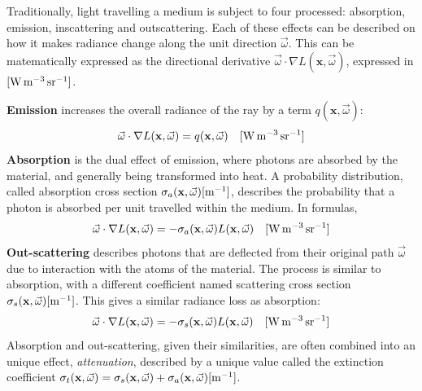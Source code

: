 Traditionally, light travelling a medium is subject to four processed: absorption, emission, inscattering and outscattering. Each of these effects can be described on how it makes radiance change along the unit direction $\vec{\omega}$. This can be matematically expressed as the directional derivative $\vec{\omega} \cdot \nabla L(\mathbf{x}, \vec{\omega})$, expressed in $\siunitnospace{\watt \per \cubic \metre \per \steradian}$. 

\textbf{Emission} increases the overall radiance of the ray by a term $q(\mathbf{x}, \vec{\omega})$:
\begin{equation*}
\vec{\omega} \cdot \nabla L(\mathbf{x}, \vec{\omega}) = q(\mathbf{x}, \vec{\omega}) \siunit{\watt \per \cubic \metre \per \steradian}
\end{equation*} 
\textbf{Absorption} is the dual effect of emission, where photons are absorbed by the material, and generally being transformed into heat. A probability distribution, called absorption cross section $\sigma_a(\mathbf{x}, \vec{\omega})  [\SI{}{\per \metre}] $, describes the probability that a photon is absorbed per unit travelled within the medium. In formulas,
\begin{equation*}
\vec{\omega} \cdot \nabla L(\mathbf{x}, \vec{\omega}) = - \sigma_a(\mathbf{x}, \vec{\omega}) L(\mathbf{x}, \vec{\omega})  \siunit{\watt \per \cubic \metre \per \steradian}
 \end{equation*}
\textbf{Out-scattering} describes photons that are deflected from their original path $\vec{\omega}$  due to interaction with the atoms of the material. The process is similar to absorption, with a different coefficient named scattering cross section $\sigma_s(\mathbf{x}, \vec{\omega}) [\SI{}{\per \metre}]$. This gives a similar radiance loss as absorption:
\begin{equation*}
\vec{\omega} \cdot \nabla L(\mathbf{x}, \vec{\omega}) = - \sigma_s(\mathbf{x}, \vec{\omega}) L(\mathbf{x}, \vec{\omega})
 \siunit{\watt \per \cubic \metre \per \steradian}
\end{equation*}
Absorption and out-scattering, given their similarities, are often combined into an unique effect, \emph{attenuation}, described by a unique value called the extinction coefficient $\sigma_t(\mathbf{x}, \vec{\omega}) =\sigma_s(\mathbf{x}, \vec{\omega}) + \sigma_a(\mathbf{x}, \vec{\omega}) [\SI{}{\per \metre}]$.

